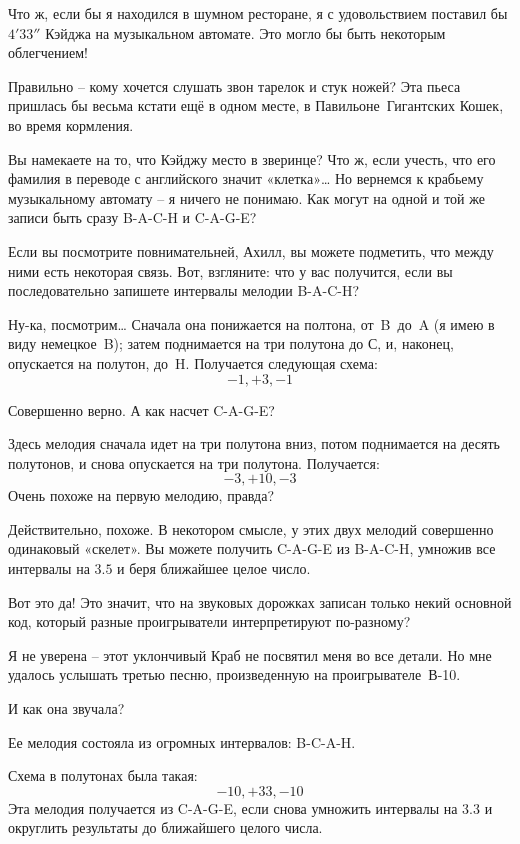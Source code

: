 \documentclass[../main.tex]{subfiles}
\begin{document}
\begin{dialogue}
 Что ж, если бы я находился в шумном ресторане, я с удовольствием поставил бы $4'33''$ Кэйджа на музыкальном автомате. Это могло бы быть некоторым облегчением!

 Правильно \--- кому хочется слушать звон тарелок и стук ножей? Эта пьеса пришлась бы весьма кстати ещё в одном месте, в Павильоне~Гигантских Кошек, во время кормления.

 Вы намекаете на то, что Кэйджу место в зверинце? Что ж, если учесть, что его фамилия в переводе с английского значит «клетка»\ldots{} Но вернемся к крабьему музыкальному автомату \--- я ничего не понимаю. Как могут на одной и той же записи быть сразу \mbox{B-A-C-H} и \mbox{C-A-G-E}?

 Если вы посмотрите повнимательней, Ахилл, вы можете подметить, что между ними есть некоторая связь. Вот, взгляните: что у вас получится, если вы последовательно запишете интервалы мелодии \mbox{B-A-C-H}?

 Ну-ка, посмотрим\ldots{} Сначала она понижается на полтона, от~B~до~A (я имею в виду немецкое~B); затем поднимается на три полутона до С, и, наконец, опускается на полутон, до~H. Получается следующая схема:
\[
    -1, +3, -1
\]

 Совершенно верно. А как насчет \mbox{C-A-G-E}?

 Здесь мелодия сначала идет на три полутона вниз, потом поднимается на десять полутонов, и снова опускается на три полутона. Получается:
\[
    -3, +10, -3
\]
Очень похоже на первую мелодию, правда?

 Действительно, похоже. В некотором смысле, у этих двух мелодий совершенно одинаковый «скелет». Вы можете получить \mbox{C-A-G-E} из \mbox{B-A-C-H}, умножив все интервалы на $3.5$ и беря ближайшее целое число.

 Вот это да! Это значит, что на звуковых дорожках записан только некий основной код, который разные проигрыватели интерпретируют по-разному?

 Я не уверена \--- этот уклончивый Краб не посвятил меня во все детали. Но мне удалось услышать третью песню, произведенную на проигрывателе~\mbox{В-10}.

 И как она звучала?

 Ее мелодия состояла из огромных интервалов: \mbox{B-C-A-H}.

Схема в полутонах была такая:
\[
    -10, +33, -10
\]
Эта мелодия получается из \mbox{C-A-G-E}, если снова умножить интервалы на $3.3$ и округлить результаты до ближайшего целого числа.


\end{dialogue}
\end{document}
